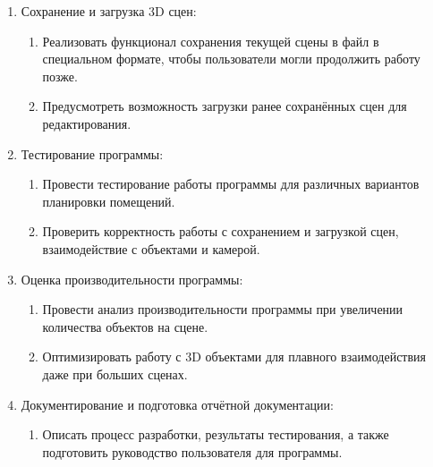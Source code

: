\begin{enumerate}
    \item Сохранение и загрузка 3D сцен:
    \begin{enumerate}
        \item Реализовать функционал сохранения текущей сцены в файл в специальном формате, чтобы пользователи могли продолжить работу позже.
        \item Предусмотреть возможность загрузки ранее сохранённых сцен для редактирования.
    \end{enumerate}
    
    \item Тестирование программы:
    \begin{enumerate}
        \item Провести тестирование работы программы для различных вариантов планировки помещений.
        \item Проверить корректность работы с сохранением и загрузкой сцен, взаимодействие с объектами и камерой.
    \end{enumerate}
    
    \item Оценка производительности программы:
    \begin{enumerate}
        \item Провести анализ производительности программы при увеличении количества объектов на сцене.
        \item Оптимизировать работу с 3D объектами для плавного взаимодействия даже при больших сценах.
    \end{enumerate}
    
    \item Документирование и подготовка отчётной документации:
    \begin{enumerate}
        \item Описать процесс разработки, результаты тестирования, а также подготовить руководство пользователя для программы.
    \end{enumerate}
\end{enumerate}

\newpage